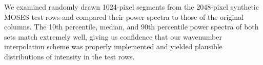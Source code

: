 


We examined randomly drawn 1024-pixel segments from the 2048-pixel synthetic MOSES test rows and compared their power spectra to those of the original columns. 
The 10th percentile, median, and 90th percentile power spectra of both sets match extremely well, giving us confidence that our wavenumber interpolation scheme was properly implemented and yielded plausible distributions of intensity in the test rows.
		
					
	

